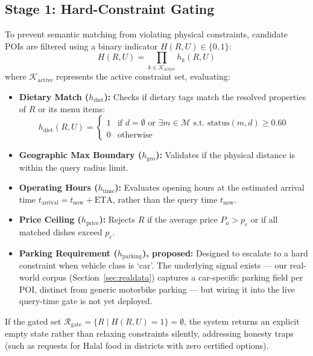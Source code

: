 \documentclass[acmsmall,screen]{acmart}
\begin{document}
\subsection{Stage 1: Hard-Constraint Gating}
\label{sec:hardgate}
To prevent semantic matching from violating physical constraints, candidate POIs are filtered using a binary indicator $H(R, U) \in \{0, 1\}$:
\begin{equation}
H(R, U) = \prod_{k \in \mathcal{K}_{\text{active}}} h_k(R, U)
\end{equation}
where $\mathcal{K}_{\text{active}}$ represents the active constraint set, evaluating:
\begin{itemize}
\item \textbf{Dietary Match ($h_{\text{diet}}$):} Checks if dietary tags match the resolved properties of $R$ or its menu items:
\begin{equation}
h_{\text{diet}}(R, U) = \begin{cases}
1 & \text{if } d = \emptyset \text{ or } \exists m \in \mathcal{M} \text{ s.t. } \text{status}(m, d) \geq 0.60 \\
0 & \text{otherwise}
\end{cases}
\end{equation}
\item \textbf{Geographic Max Boundary ($h_{\text{geo}}$):} Validates if the physical distance is within the query radius limit.
\item \textbf{Operating Hours ($h_{\text{time}}$):} Evaluates opening hours at the estimated arrival time $t_{\text{arrival}} = t_{\text{now}} + \text{ETA}$, rather than the query time $t_{\text{now}}$.
\item \textbf{Price Ceiling ($h_{\text{price}}$):} Rejects $R$ if the average price $P_a > p_c$ or if all matched dishes exceed $p_c$.
\item \textbf{Parking Requirement ($h_{\text{parking}}$), proposed:} Designed to escalate to a hard constraint when vehicle class is `car'. The underlying signal exists — our real-world corpus (Section~\ref{sec:realdata}) captures a car-specific parking field per POI, distinct from generic motorbike parking — but wiring it into the live query-time gate is not yet deployed.
\end{itemize}

If the gated set $\mathcal{R}_{\text{gate}} = \{R \mid H(R, U) = 1\} = \emptyset$, the system returns an explicit empty state rather than relaxing constraints silently, addressing honesty traps (such as requests for Halal food in districts with zero certified options).
\end{document}
